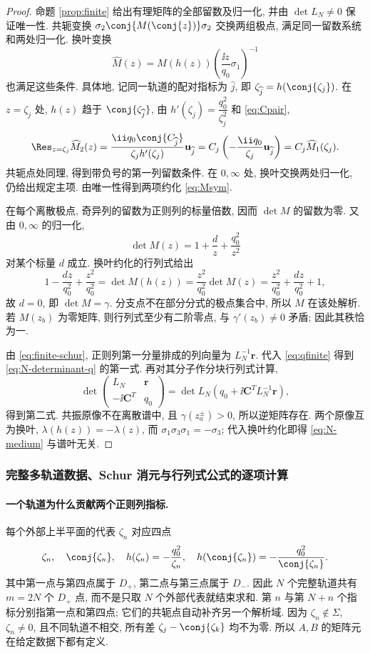 \begin{proof}
命题 \ref{prop:finite} 给出有理矩阵的全部留数及归一化, 并由 $\det L_N\ne0$ 保证唯一性. 共轭变换 $\sigma_2\conj{M(\conj{z})}\sigma_2$ 交换两组极点, 满足同一留数系统和两处归一化. 换叶变换
\[
\widehat M(z)=M(h(z))\left(\dfrac{\ii z}{q_0}\sigma_1\right)^{-1}
\]
也满足这些条件. 具体地, 记同一轨道的配对指标为 $\widehat j$, 即 $\zeta_{\widehat j}=h(\conj{\zeta_j})$. 在 $z=\zeta_j$ 处, $h(z)$ 趋于 $\conj{\zeta_{\widehat j}}$, 由 $h'(\zeta_j)=\dfrac{q_0^2}{\zeta_j^2}$ 和 \eqref{eq:Cpair},
\[
\Res_{z=\zeta_j}\widehat M_2(z)
=\dfrac{\ii q_0\conj{C_{\widehat j}}}{\zeta_jh'(\zeta_j)}\mathbf u_{\widehat j}
=C_j\left(-\dfrac{\ii q_0}{\zeta_j}\mathbf u_{\widehat j}\right)
=C_j\widehat M_1(\zeta_j).
\]
共轭点处同理, 得到带负号的第一列留数条件. 在 $0,\infty$ 处, 换叶交换两处归一化, 仍给出规定主项. 由唯一性得到两项约化 \eqref{eq:Msym}.

在每个离散极点, 奇异列的留数为正则列的标量倍数, 因而 $\det M$ 的留数为零. 又由 $0,\infty$ 的归一化,
\[
\det M(z)=1+\dfrac{d}{z}+\dfrac{q_0^2}{z^2}
\]
对某个标量 $d$ 成立. 换叶约化的行列式给出
\[
1-\dfrac{dz}{q_0^2}+\dfrac{z^2}{q_0^2}
=\det M(h(z))=\dfrac{z^2}{q_0^2}\det M(z)
=\dfrac{z^2}{q_0^2}+\dfrac{dz}{q_0^2}+1,
\]
故 $d=0$, 即 $\det M=\gamma$. 分支点不在部分分式的极点集合中, 所以 $M$ 在该处解析. 若 $M(z_b)$ 为零矩阵, 则行列式至少有二阶零点, 与 $\gamma'(z_b)\ne0$ 矛盾; 因此其秩恰为一.

由 \eqref{eq:finite-schur}, 正则列第一分量排成的列向量为 $L_N^{-1}\boldsymbol r$. 代入 \eqref{eq:qfinite} 得到 \eqref{eq:N-determinant-q} 的第一式. 再对其分子作分块行列式计算,
\[
\det\begin{pmatrix}L_N&\boldsymbol r\\-\ii\boldsymbol C^T&q_0\end{pmatrix}
=\det L_N\left(q_0+\ii\boldsymbol C^T L_N^{-1}\boldsymbol r\right),
\]
得到第二式. 共振原像不在离散谱中, 且 $\gamma(z_a^\pm)>0$, 所以逆矩阵存在. 两个原像互为换叶, $\lambda(h(z))=-\lambda(z)$, 而 $\sigma_1\sigma_3\sigma_1=-\sigma_3$; 代入换叶约化即得 \eqref{eq:N-medium} 与谱叶无关.
\end{proof}

\subsubsection*{完整多轨道数据、Schur 消元与行列式公式的逐项计算}
\paragraph{一个轨道为什么贡献两个正则列指标.}
每个外部上半平面的代表 $\zeta_n$ 对应四点
\[
\zeta_n,\quad \conj{\zeta_n},\quad
h(\zeta_n)=-\dfrac{q_0^2}{\zeta_n},\quad
h(\conj{\zeta_n})=-\dfrac{q_0^2}{\conj{\zeta_n}}.
\]
其中第一点与第四点属于 $D_+$, 第二点与第三点属于 $D_-$.
因此 $N$ 个完整轨道共有 $m=2N$ 个 $D_+$ 点,
而不是只取 $N$ 个外部代表就结束求和.
第 $n$ 与第 $N+n$ 个指标分别指第一点和第四点;
它们的共轭点自动补齐另一个解析域.
因为 $\zeta_n\notin\Sigma$, $\zeta_n\ne0$,
且不同轨道不相交, 所有差 $\zeta_j-\conj{\zeta_k}$ 均不为零.
所以 $A,B$ 的矩阵元在给定数据下都有定义.

